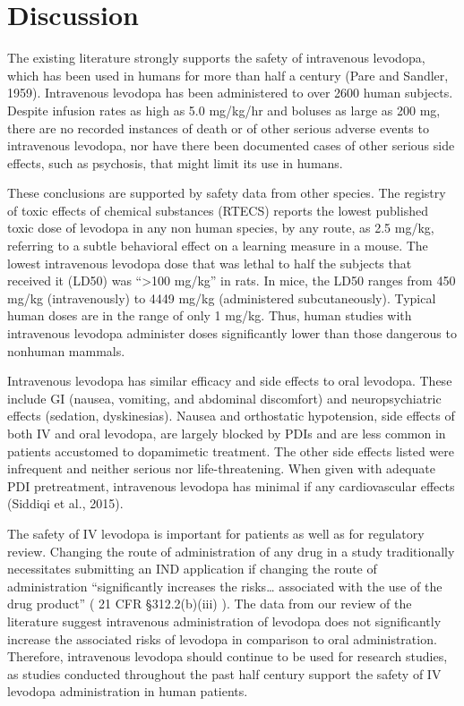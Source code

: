 \section{Discussion}
The existing literature strongly supports the safety of intravenous levodopa, which has been used in humans for more than half a century (Pare and Sandler, 1959).  Intravenous levodopa has been administered to over 2600 human subjects.  Despite infusion rates as high as 5.0 mg/kg/hr and boluses as large as 200 mg, there are no recorded instances of death or of other serious adverse events to intravenous levodopa, nor have there been documented cases of other serious side effects, such as psychosis, that might limit its use in humans.  

These conclusions are supported by safety data from other species. The registry of toxic effects of chemical substances (RTECS) reports the lowest published toxic dose of levodopa in any non human species, by any route, as 2.5 mg/kg, referring to a subtle behavioral effect on a learning measure in a mouse.  The lowest intravenous levodopa dose that was lethal to half the subjects that received it (LD50) was ``>100 mg/kg'' in rats.  In mice, the LD50 ranges from 450 mg/kg (intravenously) to 4449 mg/kg (administered subcutaneously).  Typical human doses are in the range of only 1 mg/kg.  Thus, human studies with intravenous levodopa administer doses significantly lower than those dangerous to nonhuman mammals. 

Intravenous levodopa has similar efficacy and side effects to oral levodopa.  These include GI (nausea, vomiting, and abdominal discomfort) and neuropsychiatric effects (sedation, dyskinesias).  Nausea and orthostatic hypotension, side effects of both IV and oral levodopa, are largely blocked by PDIs and are less common in patients accustomed to dopamimetic treatment.  The other side effects listed were infrequent and neither serious nor life-threatening. When given with adequate PDI pretreatment, intravenous levodopa has minimal if any cardiovascular effects (Siddiqi et al., 2015).

The safety of IV levodopa is important for patients as well as for regulatory review.  Changing the route of administration of any drug in a study traditionally necessitates submitting an IND application if changing the route of administration “significantly increases the risks… associated with the use of the drug product” ( 21 CFR \S 312.2(b)(iii) ).  The data from our review of the literature suggest intravenous administration of levodopa does not significantly increase the associated risks of levodopa in comparison to oral administration.  Therefore, intravenous levodopa should continue to be used for research studies, as studies conducted throughout the past half century support the safety of IV levodopa administration in human patients.